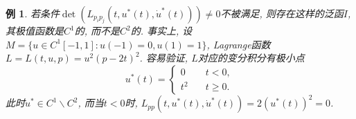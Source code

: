 \documentclass[12pt,a4paper]{article}
\newtheorem{example}[theorem]{例}
\begin{document}
\begin{example}
    若条件$\det(L_{p_ip_j}(t, u^*(t), \dot u^*(t))) \neq 0$不被满足, 则存在这样的泛函$I$, 其极值函数是$C^1$的, 而不是$C^2$的.
    事实上, 设$M = \{u \in C^1[-1, 1]\colon u(-1) = 0, u(1) = 1\}$, Lagrange函数$L = L(t, u, p) = u^2(p - 2t)^2$.
    容易验证, $L$对应的变分积分有极小点 
    \begin{equation*}
        u^*(t) = 
        \begin{cases}
            0 \quad &t < 0, \\ 
            t^2 \quad &t \geq 0.
        \end{cases}
    \end{equation*}
    此时$u^* \in C^1 \smallsetminus C^2$, 而当$t < 0$时, $L_{pp}(t, u^*(t), \dot u^*(t)) = 2(u^*(t))^2 = 0$.
\end{example}
\end{document}
